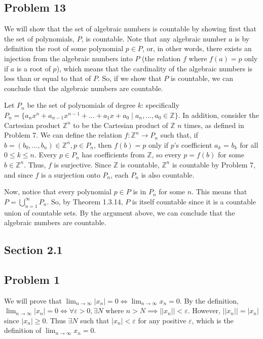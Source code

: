\documentclass[11pt]{article}
\newcommand{\Z}{\mathbb{Z}}
\begin{document}
\subsection*{Problem 13}

We will show that the set of algebraic numbers is countable by showing first that
the set of polynomials, $P$, is countable. Note that any algebraic number $a$ 
is by definition the root of some polynomial $p \in P$, or, in other words,
there exists an injection from the algebraic numbers into $P$ (the relation $f$
where $f(a) = p$ only if $a$ is a root of $p$), which means
that the cardinality of the algebraic numbers is less than or equal to that of $P$.
So, if we show that $P$ is countable, we can conclude that the algebraic numbers
are countable.

Let $P_n$ be the set of polynomials of degree $k$: specifically
$P_n = \{ a_nx^n + a_{n-1}x^{n-1}+\ldots+a_1x+a_0 \mid a_n,\ldots,a_0\in \Z \}$.
In addition, consider the Cartesian product $\Z^n$ to be the Cartesian product of
$\Z$ $n$ times, as defined in Problem 7. We can define the relation 
$f: \Z^n \to P_n$ such that, if $b = (b_0,\ldots,b_n) \in \Z^n, p \in P_n$, then
$f(b) = p$ only if $p$'s coefficient $a_k$ = $b_k$ for all $0\leq k \leq n$. 
Every $p \in P_n$ has coefficients from $\Z$, so every $p = f(b)$ for some 
$b \in \Z^n$. Thus, $f$ is surjective. Since $\Z$ is countable, $\Z^n$ is countable
by Problem 7, and since $f$ is a surjection onto $P_n$, each $P_n$ is also countable.

Now, notice that every polynomial $p \in P$ is in $P_n$ for some $n$. This means
that $P = \bigcup_{n=1}^{\infty} P_n$. So, by Theorem 1.3.14, $P$ is itself countable
since it is a countable union of countable sets. By the argument above, we can
conclude that the algebraic numbers are countable.

\subsection*{Section 2.1}
\subsection*{Problem 1}

We will prove that 
$\lim_{n \to \infty} |x_n| = 0 \iff \lim_{n \to \infty} x_n = 0$.
By the definition, $\lim_{n \to \infty} |x_n| = 0 \iff \forall \varepsilon > 0,
\exists N \text{ where } n > N \implies ||x_n|| < \varepsilon$. However,
$||x_n|| = |x_n|$ since $|x_n| \geq 0$. Thus $\exists N$ such that 
$|x_n| < \varepsilon$ for any positive $\varepsilon$, which is the definition of
$\lim_{n \to \infty} x_n = 0$.
\end{document}
